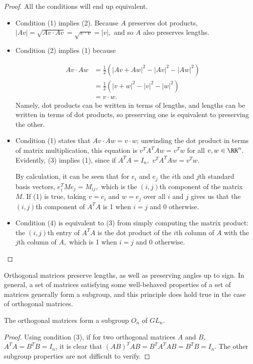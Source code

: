 \begin{proof}
All the conditions will end up equivalent.
\begin{itemize}
    \item Condition (1) implies (2). Because $A$ preserves dot products, $|Av| = \sqrt{Av\cdot Av} = \sqrt{v\cdot v} = |v|,$ and so $A$ also preserves lengths.
    
    \item Condition (2) implies (1) because
    
    \begin{align*}
            Av \cdot Aw &= \frac{1}{2} \left(|Av + Aw|^2 - |Av|^2 - |Aw|^2\right)\\
            &= \frac{1}{2} \left(|v + w|^2 - |v|^2 - |w|^2\right) \\
            &= v \cdot w.
    \end{align*} 
    Namely, dot products can be written in terms of lengths, and lengths can be written in terms of dot products, so preserving one is equivalent to preserving the other.

    \item Condition (1) states that $Av \cdot Aw = v \cdot w$; unwinding the dot product in terms of matrix multiplication, this equation is $v^TA^TAw = v^Tw$ for all $v, w \in \RR^n.$ Evidently, (3) implies (1), since if $A^TA = I_n,$ $v^TA^TAw = v^Tw.$ 
    
    By calculation, it can be seen that for $e_i$ and $e_j$ the $i$th and $j$th standard basis vectors, $e_i^T M e_j = M_{ij},$ which is the $(i, j)$th component of the matrix $M.$ If (1) is true, taking $v = e_i$ and $w = e_j$ over all $i$ and $j$ gives us that the $(i, j)$th component of $A^TA$ is 1 when $i = j$ and 0 otherwise.


    \item Condition (4) is equivalent to (3) from simply computing the matrix product: the $(i, j)$th entry of $A^TA$ is the dot product of the $i$th column of $A$ with the $j$th column of $A,$ which is 1 when $i = j$ and 0 otherwise.

\end{itemize}
\end{proof}

Orthogonal matrices preserve lengths, as well as preserving angles up to sign. In general, a set of matrices satisfying some well-behaved properties of a set of matrices generally form a subgroup, and this principle does hold true in the case of orthogonal matrices.
\begin{proposition}
    The orthogonal matrices form a subgroup $O_n$ of $GL_n$. 
\end{proposition}
\begin{proof}
    Using condition (3), if for two orthogonal matrices $A$ and $B,$ $A^TA = B^TB = I_n$, it is clear that $(AB)^TAB = B^TA^TAB = B^TB = I_n$. The other subgroup properties are not difficult to verify. 
\end{proof}

